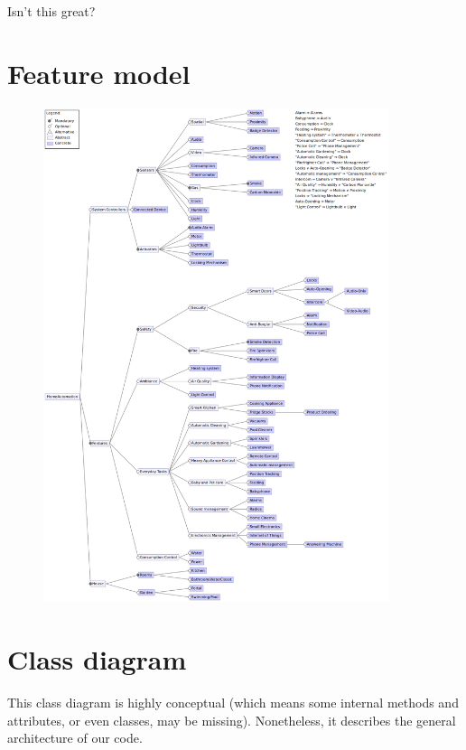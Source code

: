 			Isn't this great?
		
	\section{Feature model}		
        \begin{figure}[H]
            \includegraphics[width=0.9\textwidth]{FeatureModel_3.png}
        \end{figure}
	
	\section{Class diagram}
		This class diagram is highly conceptual (which means some internal methods and attributes, or even classes, may be missing). Nonetheless, it describes the general architecture of our code.
		
